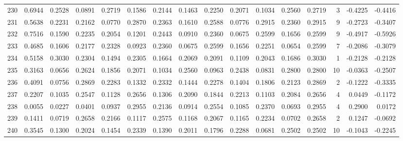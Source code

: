 \begin{tabular}{lrrrrrrrrrrrrrrr}
230 &      0.6944 &  0.2528 &  0.0891 &  0.2719 &  0.1586 &  0.2144 &  0.1463 &  0.2250 &  0.2071 &  0.1034 &   0.2560 &     0.2719 &      3 &                   -0.4225 &                    -0.4416 \\
231 &      0.5638 &  0.2231 &  0.2162 &  0.0770 &  0.2870 &  0.2363 &  0.1610 &  0.2588 &  0.0776 &  0.2915 &   0.2360 &     0.2915 &      9 &                   -0.2723 &                    -0.3407 \\
232 &      0.7516 &  0.1590 &  0.2235 &  0.2054 &  0.1201 &  0.2443 &  0.0910 &  0.2360 &  0.0675 &  0.2599 &   0.1656 &     0.2599 &      9 &                   -0.4917 &                    -0.5926 \\
233 &      0.4685 &  0.1606 &  0.2177 &  0.2328 &  0.0923 &  0.2360 &  0.0675 &  0.2599 &  0.1656 &  0.2251 &   0.0654 &     0.2599 &      7 &                   -0.2086 &                    -0.3079 \\
234 &      0.5158 &  0.3030 &  0.2304 &  0.1494 &  0.2305 &  0.1664 &  0.2069 &  0.2091 &  0.1109 &  0.2043 &   0.1686 &     0.3030 &      1 &                   -0.2128 &                    -0.2128 \\
235 &      0.3163 &  0.0656 &  0.2624 &  0.1856 &  0.2071 &  0.1034 &  0.2560 &  0.0963 &  0.2438 &  0.0831 &   0.2800 &     0.2800 &     10 &                   -0.0363 &                    -0.2507 \\
236 &      0.4091 &  0.0756 &  0.2869 &  0.2283 &  0.1332 &  0.2332 &  0.1444 &  0.2278 &  0.1404 &  0.1806 &   0.2123 &     0.2869 &      2 &                   -0.1222 &                    -0.3335 \\
237 &      0.2207 &  0.1035 &  0.2547 &  0.1128 &  0.2656 &  0.1306 &  0.2090 &  0.1844 &  0.2213 &  0.1103 &   0.2084 &     0.2656 &      4 &                    0.0449 &                    -0.1172 \\
238 &      0.0055 &  0.0227 &  0.0401 &  0.0937 &  0.2955 &  0.2136 &  0.0914 &  0.2554 &  0.1085 &  0.2370 &   0.0693 &     0.2955 &      4 &                    0.2900 &                     0.0172 \\
239 &      0.1411 &  0.0719 &  0.2658 &  0.2166 &  0.1117 &  0.2575 &  0.1168 &  0.2067 &  0.1165 &  0.2234 &   0.0702 &     0.2658 &      2 &                    0.1247 &                    -0.0692 \\
240 &      0.3545 &  0.1300 &  0.2024 &  0.1454 &  0.2339 &  0.1390 &  0.2011 &  0.1796 &  0.2288 &  0.0681 &   0.2502 &     0.2502 &     10 &                   -0.1043 &                    -0.2245 \\

\end{tabular}
